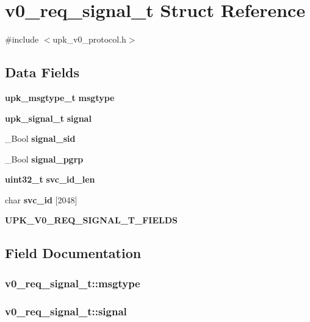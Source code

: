 \section{v0\_\-req\_\-signal\_\-t Struct Reference}
\label{structv0__req__signal__t}


{\ttfamily \#include $<$upk\_\-v0\_\-protocol.h$>$}

\subsection*{Data Fields}
\begin{DoxyCompactItemize}
\item 
{\bf upk\_\-msgtype\_\-t} {\bf msgtype}
\item 
{\bf upk\_\-signal\_\-t} {\bf signal}
\item 
\_\-Bool {\bf signal\_\-sid}
\item 
\_\-Bool {\bf signal\_\-pgrp}
\item 
{\bf uint32\_\-t} {\bf svc\_\-id\_\-len}
\item 
char {\bf svc\_\-id} [2048]
\item 
{\bf UPK\_\-V0\_\-REQ\_\-SIGNAL\_\-T\_\-FIELDS}
\end{DoxyCompactItemize}


\subsection{Field Documentation}
\subsubsection[{msgtype}]{ {\bf v0\_\-req\_\-signal\_\-t::msgtype}}\label{structv0__req__signal__t_a4089f4af412652b79ba396e022e0f8c0}
\subsubsection[{signal}]{ {\bf v0\_\-req\_\-signal\_\-t::signal}}\label{structv0__req__signal__t_a82de9510ed68f2674db07e1f72b9ed14}
